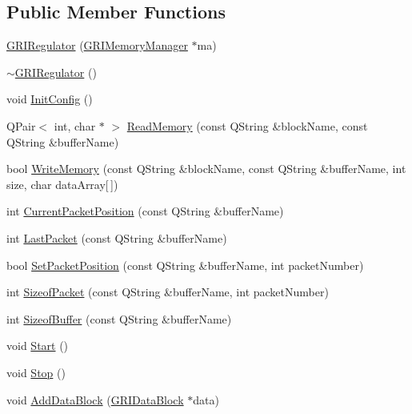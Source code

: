 \subsection*{\-Public \-Member \-Functions}
\begin{DoxyCompactItemize}
\item 
\hyperlink{classGRIRegulator_a728a2a26cf85a297fdbf4e7d14e3b6f1}{\-G\-R\-I\-Regulator} (\hyperlink{classGRIMemoryManager}{\-G\-R\-I\-Memory\-Manager} $\ast$ma)
\item 
\hyperlink{classGRIRegulator_a66efa63d7f1cb4ef145509438e06f6be}{$\sim$\-G\-R\-I\-Regulator} ()
\item 
void \hyperlink{classGRIRegulator_a5cc42ce8a036e62cc61939a6c30d1b98}{\-Init\-Config} ()
\item 
\-Q\-Pair$<$ int, char $\ast$ $>$ \hyperlink{classGRIRegulator_a2f1e359537054a4fb69490e0180bb06f}{\-Read\-Memory} (const \-Q\-String \&block\-Name, const \-Q\-String \&buffer\-Name)
\item 
bool \hyperlink{classGRIRegulator_a535dd128b732df3950c189f6404c5607}{\-Write\-Memory} (const \-Q\-String \&block\-Name, const \-Q\-String \&buffer\-Name, int size, char data\-Array\mbox{[}$\,$\mbox{]})
\item 
int \hyperlink{classGRIRegulator_a6114f5b000254c666dac349ed790ee05}{\-Current\-Packet\-Position} (const \-Q\-String \&buffer\-Name)
\item 
int \hyperlink{classGRIRegulator_ac120f773e0fc99ba956027dfcf06574c}{\-Last\-Packet} (const \-Q\-String \&buffer\-Name)
\item 
bool \hyperlink{classGRIRegulator_a51bd194df93c5db285624115c70dfafe}{\-Set\-Packet\-Position} (const \-Q\-String \&buffer\-Name, int packet\-Number)
\item 
int \hyperlink{classGRIRegulator_a4aacbfe3b9e1d12686e8641c8fad0d5a}{\-Sizeof\-Packet} (const \-Q\-String \&buffer\-Name, int packet\-Number)
\item 
int \hyperlink{classGRIRegulator_ae1b5a1bab87e4b58251842a0b6322e98}{\-Sizeof\-Buffer} (const \-Q\-String \&buffer\-Name)
\item 
void \hyperlink{classGRIRegulator_a924c4fa2df0b032223e37bc53ffadd30}{\-Start} ()
\item 
void \hyperlink{classGRIRegulator_a1ff6e0e5f53ef3cf6f468d994eb007a2}{\-Stop} ()
\item 
void \hyperlink{classGRIRegulator_a2cbb8bf8c1c6592c19caaad328484a8d}{\-Add\-Data\-Block} (\hyperlink{classGRIDataBlock}{\-G\-R\-I\-Data\-Block} $\ast$data)
\item 

\end{DoxyCompactItemize}
